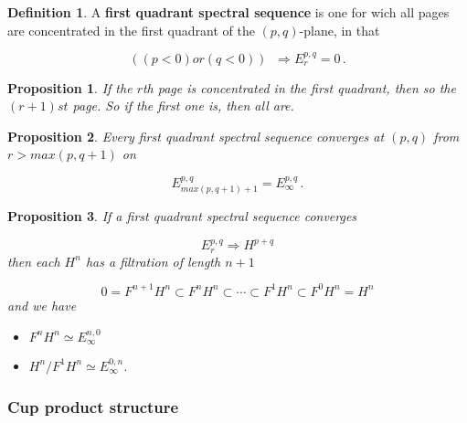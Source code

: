\documentclass[12pt,titlepage]{article}
\newcommand{\gt}{>}
\newcommand{\lt}{<}
\theoremstyle{plain}
\newtheorem{prop}{Proposition}
\theoremstyle{definition}
\newtheorem{defn}{Definition}
\theoremstyle{remark}
\begin{document}
\begin{defn}
\label{first_quadrant_spectral_sequence}\hypertarget{}{}
A \textbf{first quadrant spectral sequence} is one for wich all pages are concentrated in the first quadrant of the $(p,q)$-plane, in that

\begin{displaymath}
((p \lt 0) or (q \lt 0))
  \;\;
  \Rightarrow
  E_r^{p,q} = 0
  \,.
\end{displaymath}
\end{defn}
\begin{prop}
If the $r$th page is concentrated in the first quadrant, then so the $(r+1)st$ page. So if the first one is, then all are.

\end{prop}
\begin{prop}
Every first quadrant spectral sequence converges at $(p,q)$ from $r \gt max(p,q+1)$ on

\begin{displaymath}
E_{max(p,q+1)+1}^{p,q} = E_\infty^{p,q}
  \,.
\end{displaymath}
\end{prop}
\begin{prop}
If a first quadrant spectral sequence converges

\begin{displaymath}
E_r^{p,q} \Rightarrow H^{p+q}
\end{displaymath}
then each $H^n$ has a filtration of length $n+1$

\begin{displaymath}
0 = F^{n+1}H^n \subset F^n H^n \subset \cdots \subset F^1 H^n \subset F^0 H^n = H^n
\end{displaymath}
and we have

\begin{itemize}%
\item $F^n H^n \simeq E_\infty^{n,0}$


\item $H^n/F^1 H^n \simeq E_\infty^{0,n}$.



\end{itemize}
\end{prop}
\hypertarget{PropertiesCupProductStructure}{}\subsubsection*{{Cup product structure}}\label{PropertiesCupProductStructure}
\end{document}

